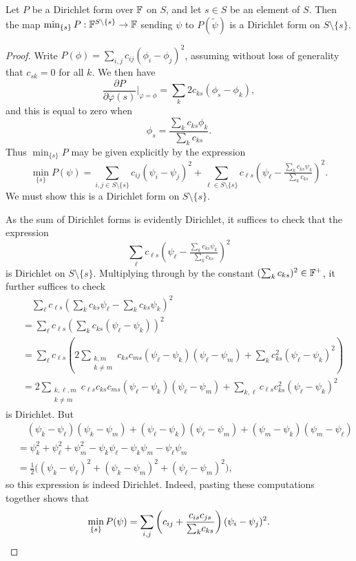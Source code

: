 \begin{lemma} \label{lem:onestepdirichletmin}
  Let $P$ be a Dirichlet form over ${\mathbb F}$ on $S$, and let $s \in S$ be an element
  of $S$. Then the map $\min_{\{s\}} P:{\mathbb F}^{S \setminus\{s\}} \to {\mathbb F}$ sending
  $\psi$ to $P(\tilde\psi)$ is a Dirichlet form on $S \setminus \{s\}$.
\end{lemma}
\begin{proof}
  Write $P(\phi) = \sum_{i,j} c_{ij}(\phi_i -\phi_j)^2$, assuming without loss
  of generality that $c_{sk} =0$ for all $k$. We then have
  \[
    \frac{\partial P}{\partial \varphi(s)}\bigg\vert_{\varphi = \phi} = \sum_k
    2c_{ks}(\phi_s-\phi_k),
  \]
  and this is equal to zero when
  \[
    \phi_s = \frac{\sum_k c_{ks}\phi_k}{\sum_k c_{ks}}.
  \]
  Thus $\min_{\{s\}}P$ may be given explicitly by the expression
  \[
    \min_{\{s\}} P(\psi) = \sum_{i,j \in S \setminus \{s\}} c_{ij}(\psi_i -\psi_j)^2 +
    \sum_{\ell \in S \setminus \{s\}} c_{\ell s}\left(\psi_\ell - \tfrac{\sum_k
      c_{ks} \psi_k}{\sum_k c_{ks}}\right)^2.
  \]
  We must show this is a Dirichlet form on $S \setminus \{s\}$. 
  
  As the sum of Dirichlet forms is evidently Dirichlet, it suffices to check that the expression 
  \[
    \sum_\ell c_{\ell s}\left(\psi_\ell - \tfrac{\sum_k c_{ks} \psi_k}{\sum_k
      c_{ks}}\right)^2
  \]
  is Dirichlet on $S \setminus \{s\}$. Multiplying through by the constant
  $(\sum_k c_{ks})^2 \in {\mathbb F}^+$, it further suffices to check
  \begin{align*}
    &\quad \sum_\ell c_{\ell s}\left(\sum_k c_{ks} \psi_\ell - \sum_k c_{ks}
    \psi_k\right)^2 \\
    &= \sum_\ell c_{\ell s} \left(\sum_k c_{ks} (\psi_\ell -
    \psi_k)\right)^2 \\
    &= \sum_\ell c_{\ell s} \left(2 \sum_{\substack{k,m \\ k \ne m}} c_{k s} c_{ms}
    (\psi_\ell-\psi_k)(\psi_\ell - \psi_m) + \sum_{k} c_{k
    s}^2(\psi_\ell-\psi_k)^2\right) \\
    &= 2\sum_{\substack{k,\ell,m \\ k \ne m}} c_{\ell s} c_{k s} c_{ms}
    (\psi_\ell-\psi_k)(\psi_\ell - \psi_m) + \sum_{k, \ell} c_{\ell s}c_{k
    s}^2(\psi_\ell-\psi_k)^2
  \end{align*}
  is Dirichlet. But
  \begin{align*}
    &\quad (\psi_k - \psi_\ell)(\psi_k - \psi_m)+(\psi_\ell - \psi_k)(\psi_\ell -
    \psi_m) + (\psi_m-\psi_k)(\psi_m-\psi_\ell) \\ 
    &= \psi_k^2+\psi_\ell^2+\psi_m^2-\psi_k\psi_\ell- \psi_k\psi_m -
    \psi_\ell\psi_m \\
    &= \tfrac12\big( (\psi_k-\psi_\ell)^2 +(\psi_k-\psi_m)^2
    +(\psi_\ell-\psi_m)^2\big),
  \end{align*}
  so this expression is indeed Dirichlet. Indeed, pasting these computations
  together shows that
  \[
    \min_{\{s\}}P(\psi) = \sum_{i,j} \left(c_{ij}+\frac{c_{is}c_{js}}{{\textstyle \sum_k}
    c_{ks}}\right)(\psi_i-\psi_j)^2. \qedhere
  \]
\end{proof}

